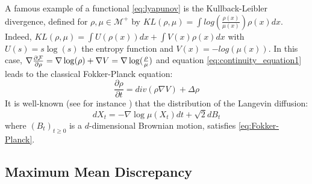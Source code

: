 \begin{remark} \label{rem:KL_Lyapunov}
	A famous example of a functional \eqref{eq:lyapunov} is the Kullback-Leibler divergence, defined for $\rho, \mu \in \mathcal{M}^+$ by
	$KL(\rho,\mu)=\int log(\frac{\rho(x)}{\mu(x)})\rho(x)dx$. Indeed, $KL(\rho, \mu)=\int U(\rho(x))dx + \int V(x) \rho(x)dx$ with $U(s)=s\log(s)$ the entropy function and $V(x)=-log(\mu(x))$. In this case, $\nabla \frac{\partial {{\mathcal F}}}{\partial \rho}= \nabla \log(\rho) + \nabla V=  \nabla \log(\frac{\rho}{\mu})$ and equation \eqref{eq:continuity_equation1} leads to the classical Fokker-Planck equation:
	\begin{equation}\label{eq:Fokker-Planck}
	\frac{\partial{\rho}}{\partial t}= div(\rho \nabla V )+ \Delta \rho
	\end{equation}
	It is well-known (see for instance \cite{jordan1998variational}) that the distribution of the Langevin diffusion:
	\begin{equation}\label{eq:langevin_diffusion}
	dX_t= -\nabla \log \mu (X_t)dt+\sqrt{2}dB_t
	\end{equation}
	where $(B_t)_{t\ge0}$ is a $d$-dimensional Brownian motion, satisfies \eqref{eq:Fokker-Planck}.
\end{remark}



\subsection{Maximum Mean Discrepancy}\label{subsec:MMD}

